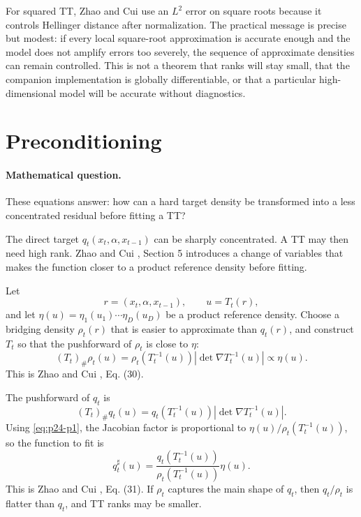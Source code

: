 \documentclass[11pt]{article}
\numberwithin{equation}{section}
\begin{document}
For squared TT, Zhao and Cui \cite{zhao2024ttsequential} use an \(L^2\) error on square roots because it
controls Hellinger distance after normalization.  The practical message is
precise but modest: if every local square-root approximation is accurate enough
and the model does not amplify errors too severely, the sequence of approximate
densities can remain controlled.  This is not a theorem that ranks will stay
small, that the companion implementation is globally differentiable, or that a
particular high-dimensional model will be accurate without diagnostics.

\section{Preconditioning}

\paragraph{Mathematical question.}
These equations answer: how can a hard target density be transformed into a
less concentrated residual before fitting a TT?

The direct target \(q_t(x_t,\alpha,x_{t-1})\) can be sharply concentrated.  A TT
may then need high rank.  Zhao and Cui \cite{zhao2024ttsequential}, Section 5 introduces a change of variables
that makes the function closer to a product reference density before fitting.

Let
\[
    r=(x_t,\alpha,x_{t-1}),\qquad u=T_t(r),
\]
and let \(\eta(u)=\eta_1(u_1)\cdots\eta_D(u_D)\) be a product reference density.
Choose a bridging density \(\rho_t(r)\) that is easier to approximate than
\(q_t(r)\), and construct \(T_t\) so that the pushforward of \(\rho_t\) is close
to \(\eta\):
\begin{equation}
    (T_t)_\#\rho_t(u)
    =
    \rho_t(T_t^{-1}(u))
    \left|\det\nabla T_t^{-1}(u)\right|
    \propto
    \eta(u).
    \label{eq:p24-p1}
\end{equation}
This is Zhao and Cui \cite{zhao2024ttsequential}, Eq. (30).

The pushforward of \(q_t\) is
\[
    (T_t)_\#q_t(u)
    =
    q_t(T_t^{-1}(u))
    \left|\det\nabla T_t^{-1}(u)\right|.
\]
Using \eqref{eq:p24-p1}, the Jacobian factor is proportional to
\(\eta(u)/\rho_t(T_t^{-1}(u))\), so the function to fit is
\begin{equation}
    q^\sharp_t(u)
    =
    \frac{q_t(T_t^{-1}(u))}
    {\rho_t(T_t^{-1}(u))}
    \eta(u).
    \label{eq:p24-p2}
\end{equation}
This is Zhao and Cui \cite{zhao2024ttsequential}, Eq. (31).  If \(\rho_t\) captures the main shape of \(q_t\),
then \(q_t/\rho_t\) is flatter than \(q_t\), and TT ranks may be smaller.
\end{document}
